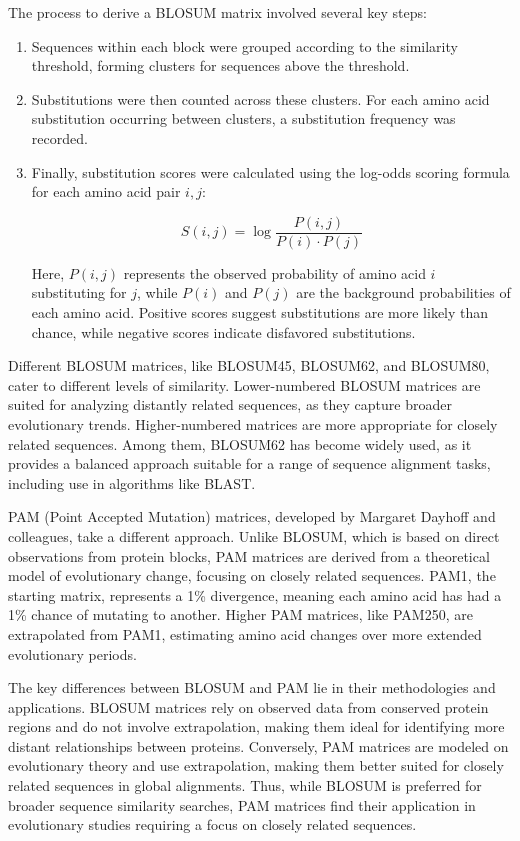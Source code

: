The process to derive a BLOSUM matrix involved several key steps:
\begin{enumerate}
    \item Sequences within each block were grouped according to the similarity threshold, forming clusters for sequences above the threshold.
    \item Substitutions were then counted across these clusters. For each amino acid substitution occurring between clusters, a substitution frequency was recorded.
    \item Finally, substitution scores were calculated using the log-odds scoring formula for each amino acid pair $i, j$:
    
    \begin{equation}
    S(i, j) = \log \frac{P(i, j)}{P(i) \cdot P(j)}
    \end{equation}
    
    Here, $P(i, j)$ represents the observed probability of amino acid $i$ substituting for $j$, while $P(i)$ and $P(j)$ are the background probabilities of each amino acid. Positive scores suggest substitutions are more likely than chance, while negative scores indicate disfavored substitutions.
\end{enumerate}

Different BLOSUM matrices, like BLOSUM45, BLOSUM62, and BLOSUM80, cater to different levels of similarity. Lower-numbered BLOSUM matrices are suited for analyzing distantly related sequences, as they capture broader evolutionary trends. Higher-numbered matrices are more appropriate for closely related sequences. Among them, BLOSUM62 has become widely used, as it provides a balanced approach suitable for a range of sequence alignment tasks, including use in algorithms like BLAST.

PAM (Point Accepted Mutation) matrices, developed by Margaret Dayhoff and colleagues, take a different approach. Unlike BLOSUM, which is based on direct observations from protein blocks, PAM matrices are derived from a theoretical model of evolutionary change, focusing on closely related sequences. PAM1, the starting matrix, represents a 1\% divergence, meaning each amino acid has had a 1\% chance of mutating to another. Higher PAM matrices, like PAM250, are extrapolated from PAM1, estimating amino acid changes over more extended evolutionary periods.

The key differences between BLOSUM and PAM lie in their methodologies and applications. BLOSUM matrices rely on observed data from conserved protein regions and do not involve extrapolation, making them ideal for identifying more distant relationships between proteins. Conversely, PAM matrices are modeled on evolutionary theory and use extrapolation, making them better suited for closely related sequences in global alignments. Thus, while BLOSUM is preferred for broader sequence similarity searches, PAM matrices find their application in evolutionary studies requiring a focus on closely related sequences.

